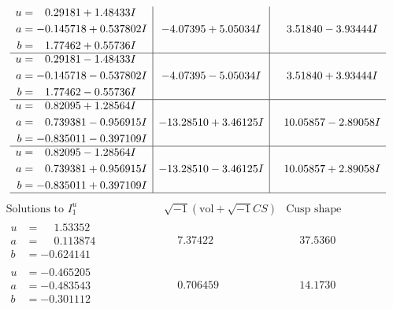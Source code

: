 \documentclass[1p]{elsarticle_modified}
\theoremstyle{definition}
\newcommand{\I}{\sqrt{-1}}
\begin{document}
$$\begin{array}{c|c|c}
\begin{aligned}
u &= \phantom{-}0.29181 + 1.48433 I \\
a &= -0.145718 + 0.537802 I \\
b &= \phantom{-}1.77462 + 0.55736 I\end{aligned}
 & -4.07395 + 5.05034 I & \phantom{-}3.51840 - 3.93444 I \\ \hline\begin{aligned}
u &= \phantom{-}0.29181 - 1.48433 I \\
a &= -0.145718 - 0.537802 I \\
b &= \phantom{-}1.77462 - 0.55736 I\end{aligned}
 & -4.07395 - 5.05034 I & \phantom{-}3.51840 + 3.93444 I \\ \hline\begin{aligned}
u &= \phantom{-}0.82095 + 1.28564 I \\
a &= \phantom{-}0.739381 - 0.956915 I \\
b &= -0.835011 - 0.397109 I\end{aligned}
 & -13.28510 + 3.46125 I & \phantom{-}10.05857 - 2.89058 I \\ \hline\begin{aligned}
u &= \phantom{-}0.82095 - 1.28564 I \\
a &= \phantom{-}0.739381 + 0.956915 I \\
b &= -0.835011 + 0.397109 I\end{aligned}
 & -13.28510 - 3.46125 I & \phantom{-}10.05857 + 2.89058 I\\
 \hline 
 \end{array}$$\newpage$$\begin{array}{c|c|c}  
\text{Solutions to }I^u_{1}& \I (\text{vol} + \sqrt{-1}CS) & \text{Cusp shape}\\
 \hline 
\begin{aligned}
u &= \phantom{-}1.53352\phantom{ +0.000000I} \\
a &= \phantom{-}0.113874\phantom{ +0.000000I} \\
b &= -0.624141\phantom{ +0.000000I}\end{aligned}
 & \phantom{-}7.37422\phantom{ +0.000000I} & \phantom{-}37.5360\phantom{ +0.000000I} \\ \hline\begin{aligned}
u &= -0.465205\phantom{ +0.000000I} \\
a &= -0.483543\phantom{ +0.000000I} \\
b &= -0.301112\phantom{ +0.000000I}\end{aligned}
 & \phantom{-}0.706459\phantom{ +0.000000I} & \phantom{-}14.1730\phantom{ +0.000000I} \\ \hline\begin{aligned}

\end{aligned}
\end{array}$$
\end{document}
